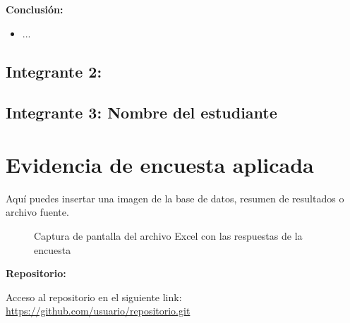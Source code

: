 \documentclass[12pt, a4paper]{article}
\begin{document}
\textbf{Conclusión:}
\begin{itemize}
    \item ...
\end{itemize}

\newpage
\subsection*{Integrante 2: }


\newpage
\subsection*{Integrante 3: Nombre del estudiante}


\section{Evidencia de encuesta aplicada}
Aquí puedes insertar una imagen de la base de datos, resumen de resultados o archivo fuente.

\begin{figure}[H]
    \centering
    \caption{Captura de pantalla del archivo Excel con las respuestas de la encuesta}
\end{figure}


\textbf{Repositorio:}  
\label{anexo:repositorio}

Acceso al repositorio en el siguiente link:  
\url{https://github.com/usuario/repositorio.git}
\end{document}
